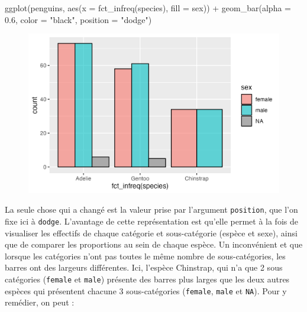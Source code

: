 \documentclass[
  letterpaper,
  DIV=11,
  numbers=noendperiod]{scrreprt}
\newenvironment{Shaded}{\begin{snugshade}}{\end{snugshade}}
\newcommand{\AttributeTok}[1]{\textcolor[rgb]{0.40,0.45,0.13}{#1}}
\newcommand{\FloatTok}[1]{\textcolor[rgb]{0.68,0.00,0.00}{#1}}
\newcommand{\FunctionTok}[1]{\textcolor[rgb]{0.28,0.35,0.67}{#1}}
\newcommand{\NormalTok}[1]{\textcolor[rgb]{0.00,0.23,0.31}{#1}}
\newcommand{\SpecialCharTok}[1]{\textcolor[rgb]{0.37,0.37,0.37}{#1}}
\newcommand{\StringTok}[1]{\textcolor[rgb]{0.13,0.47,0.30}{#1}}
\begin{document}
\begin{Shaded}
\begin{Highlighting}[]
\FunctionTok{ggplot}\NormalTok{(penguins, }\FunctionTok{aes}\NormalTok{(}\AttributeTok{x =} \FunctionTok{fct\_infreq}\NormalTok{(species), }\AttributeTok{fill =}\NormalTok{ sex)) }\SpecialCharTok{+}
  \FunctionTok{geom\_bar}\NormalTok{(}\AttributeTok{alpha =} \FloatTok{0.6}\NormalTok{, }\AttributeTok{color =} \StringTok{"black"}\NormalTok{, }\AttributeTok{position =} \StringTok{"dodge"}\NormalTok{)}
\end{Highlighting}
\end{Shaded}

\begin{figure}[H]

{\centering \includegraphics{./03-visualization_files/figure-pdf/unnamed-chunk-58-1.png}

}

\end{figure}

La seule chose qui a changé est la valeur prise par l'argument
\texttt{position}, que l'on fixe ici à \texttt{dodge}. L'avantage de
cette représentation est qu'elle permet à la fois de visualiser les
effectifs de chaque catégorie et sous-catégorie (espèce et sexe), ainsi
que de comparer les proportions au sein de chaque espèce. Un
inconvénient et que lorsque les catégories n'ont pas toutes le même
nombre de sous-catégories, les barres ont des largeurs différentes. Ici,
l'espèce Chinstrap, qui n'a que 2 sous catégories (\texttt{female} et
\texttt{male}) présente des barres plus larges que les deux autres
espèces qui présentent chacune 3 sous-catégories (\texttt{female},
\texttt{male} et \texttt{NA}). Pour y remédier, on peut :
\end{document}
